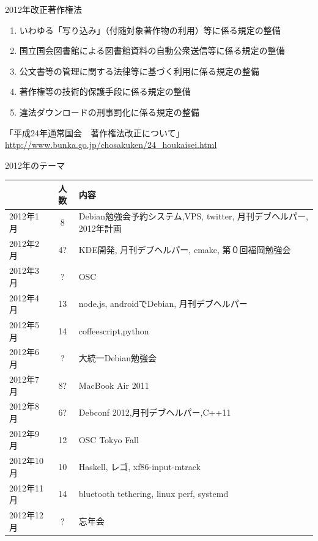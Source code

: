 \begin{frame}{2012年改正著作権法}
\begin{enumerate}
 \item  いわゆる「写り込み」（付随対象著作物の利用）等に係る規定の整備
 \item  国立国会図書館による図書館資料の自動公衆送信等に係る規定の整備
 \item  公文書等の管理に関する法律等に基づく利用に係る規定の整備
 \item  著作権等の技術的保護手段に係る規定の整備
 \item  違法ダウンロードの刑事罰化に係る規定の整備 
\end{enumerate}
 「平成24年通常国会　著作権法改正について」
\url{http://www.bunka.go.jp/chosakuken/24_houkaisei.html}
\end{frame}


\begin{frame}{2012年のテーマ}
  \begin{tabular}{|l|c|p{17em}|}
 \hline
 & 人数 & 内容\\
 \hline
   2012年1月 & 8 & Debian勉強会予約システム,VPS, twitter, 
	   月刊デブヘルパー, 2012年計画\\
   2012年2月 & 4? & KDE開発, 月刊デブヘルパー, cmake,  第０回福岡勉強会\\
   2012年3月 & ? & OSC \\
   2012年4月 & 13 & node.js, androidでDebian, 月刊デブヘルパー\\
   2012年5月 & 14 & coffeescript,python\\
   2012年6月 & ? & 大統一Debian勉強会 \\
   2012年7月 & 8? & MacBook Air 2011\\
   2012年8月 & 6? & Debconf 2012,月刊デブヘルパー,C++11 \\
   2012年9月 & 12 & OSC Tokyo Fall\\
   2012年10月 & 10 & Haskell, レゴ, xf86-input-mtrack\\
   2012年11月 & 14 & bluetooth tethering, linux perf, systemd\\
   2012年12月 & ? & 忘年会 \\
 \hline
\end{tabular}
\end{frame}

